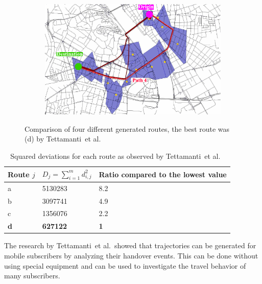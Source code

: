 \documentclass[master,english]{hgbthesis}
\begin{document}
\begin{figure}
\begin{subfigure}[b]{0.5\linewidth}
			\caption{}
			\label{fig:tattipath2}
		\end{subfigure}%
		~
		\begin{subfigure}[b]{0.5\linewidth}
			\includegraphics[width=\textwidth]{./images/tattipath3}
			\caption{}
			\label{fig:tattipath3}
		\end{subfigure}
	\caption{Comparison of four different generated routes, the best route was (d) by Tettamanti~et al.\ \cite{Tettamanti2012}}\label{fig:tettaroutes}
\end{figure}
\begin{table}[ht]
\begin{tabular}{l|ll}
\hline
Route $j$                   &  $D_j=\sum_{i=1}^{m} d_{i,j}^{2}$ & Ratio compared to
the lowest value  \\ \hline
a&5130283&8.2 \\
b&3097741&4.9 \\
c&1356076&2.2 \\
\textbf{d}  &\textbf{627122} &\textbf{1} \\ \hline
\end{tabular}
\caption{Squared deviations for each route as observed by Tettamanti~et al.\ \cite{Tettamanti2012}}
\label{tab:tetta}
\end{table}
The research by Tettamanti~et al.\ showed that trajectories can be generated for mobile subscribers by analyzing their handover events. This can be done without using special equipment and can be used to investigate the travel behavior of many subscribers.
\end{document}
